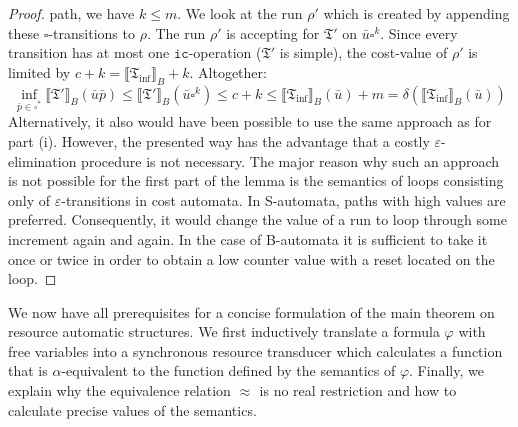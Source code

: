 \documentclass{LMCS}
\newcommand{\eps}{\varepsilon}
\newcommand{\pad}{\square}
\newcommand{\automatonT}{\mathfrak T}
\newcommand{\semantics}[1]{\llbracket#1\rrbracket}
\newcommand{\costEquiv}[1][\alpha]{\approx_{#1}}
\newcommand{\icOp}{\ensuremath{\mathtt{i\! c}}}
\begin{document}
\begin{proof}
path, we have $k \le m$. We look at the run $\rho'$ which is created by
appending these $\pad$-transitions to $\rho$. The run $\rho'$ is accepting for
$\automatonT'$ on $\bar u \pad^k$. Since every transition has at most one
$\icOp$-operation ($\automatonT'$ is simple), the cost-value of $\rho'$ is
limited by $c + k = \semantics{\automatonT_{\inf}}_B + k$. Altogether:
\[
 \inf\limits_{\bar p \in \pad^*} \semantics{\automatonT'}_B(\bar u \bar p) 
 \le  \semantics{\automatonT'}_B(\bar u \pad^k) \le c + k 
 \le \semantics{\automatonT_{\inf}}_B(\bar u) + m 
 = \delta\left(\semantics{\automatonT_{\inf}}_B(\bar u)\right)
\]
Alternatively, it also would have been possible to use the same approach as for
part (i). However, the presented way has the advantage that a costly
$\eps$-elimination procedure is not necessary. The major reason why such an
approach is not possible for the first part of the lemma is the semantics of
loops consisting only of $\eps$-transitions in cost automata. In S-automata,
paths with high values are preferred. Consequently, it would change the value
of a run to loop through some increment again and again. In the case of
B-automata it is sufficient to take it once or twice in order to obtain a low
counter value with a reset located on the loop. 
\end{proof}

We now have all prerequisites for a concise formulation of the main theorem on
resource automatic structures. We first inductively translate a formula
$\varphi$ with free variables into a synchronous resource transducer which
calculates a function that is $\alpha$-equivalent to the function defined by the
semantics of $\varphi$. Finally, we
explain why the equivalence relation $\costEquiv[]$ is no real restriction and
how to calculate precise values of the semantics.
\end{document}
